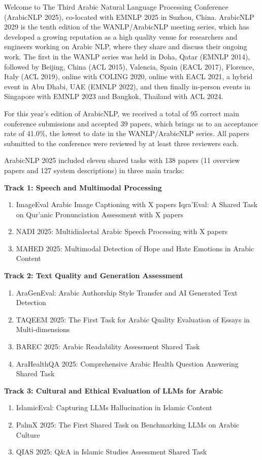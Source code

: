 Welcome to The Third Arabic Natural Language Processing Conference (ArabicNLP 2025), co-located with EMNLP 2025 in Suzhou, China. ArabicNLP 2029 is the tenth edition of the WANLP/ArabicNLP meeting series, which has developed a growing reputation as a high quality venue for researchers and engineers working on Arabic NLP, where they share and discuss their ongoing work. The first in the WANLP series was held in Doha, Qatar (EMNLP 2014), followed by Beijing, China (ACL 2015), Valencia, Spain (EACL 2017), Florence, Italy (ACL 2019), online with COLING 2020, online with EACL 2021, a hybrid event in Abu Dhabi, UAE (EMNLP 2022), and then finally in-person events in Singapore with EMNLP 2023 and Bangkok, Thailand with ACL 2024.

For this year’s edition of ArabicNLP, we received a total of 95 correct main conference submissions and accepted 39 papers, which brings us to an acceptance rate of 41.0\%, the lowest to date in the WANLP/ArabicNLP series. All papers submitted to the conference were reviewed by at least three reviewers each.

ArabicNLP 2025 included eleven shared tasks with 138 papers (11 overview papers and 127 system descriptions) in three main tracks:

\textbf{Track 1: Speech and Multimodal Processing }
\begin{enumerate}
\item  ImageEval Arabic Image Captioning with X papers
Iqra'Eval: A Shared Task on Qur'anic Pronunciation Assessment with X papers
\item NADI 2025: Multidialectal Arabic Speech Processing with X papers
\item MAHED 2025: Multimodal Detection of Hope and Hate Emotions in Arabic Content
\end{enumerate}

\textbf{Track 2: Text Quality and Generation Assessment}
\begin{enumerate}
\item AraGenEval: Arabic Authorship Style Transfer and AI Generated Text Detection
\item TAQEEM 2025: The First Task for Arabic Quality Evaluation of Essays in Multi-dimensions
\item BAREC 2025: Arabic Readability Assessment Shared Task
\item AraHealthQA 2025: Comprehensive Arabic Health Question Answering Shared Task
\end{enumerate}

\textbf{Track 3: Cultural and Ethical Evaluation of LLMs for Arabic}
\begin{enumerate}
\item IslamicEval: Capturing LLMs Hallucination in Islamic Content
\item PalmX 2025: The First Shared Task on Benchmarking LLMs on Arabic Culture
\item QIAS 2025: Q\&A in Islamic Studies Assessment Shared Task
\end{enumerate}

